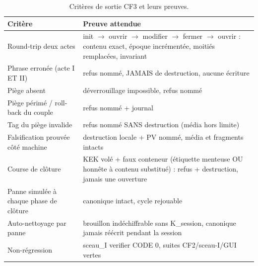 \begin{table}[htbp]
\centering\small
\caption{Critères de sortie CF3 et leurs preuves.}
\label{tab:sortiecf3}
\begin{tabularx}{\textwidth}{@{}Y Y@{}}
\toprule
\textbf{Critère} & \textbf{Preuve attendue} \\
\midrule
Round-trip deux actes & init $\to$ ouvrir $\to$ modifier $\to$ fermer $\to$ ouvrir :
contenu exact, époque incrémentée, moitiés remplacées,  invariant \\
Phrase erronée (acte I ET II) & refus nommé, JAMAIS de destruction, aucune écriture \\
Piège absent & déverrouillage impossible, refus nommé \\
Piège périmé / roll-back du couple & refus nommé + journal \\
Tag du piège invalide & refus nommé SANS destruction (média hors limite) \\
Falsification prouvée côté machine & destruction locale + PV nommé, média et fragments
intacts \\
Course de clôture & KEK volé + faux conteneur (étiquette menteuse OU honnête à
contenu substitué) : refus + destruction, jamais une ouverture \\
Panne simulée à chaque phase de clôture & canonique intact, cycle rejouable \\
Auto-nettoyage par panne & brouillon indéchiffrable sans K\_session, canonique jamais
réécrit pendant la session \\
Non-régression & sceau\_I verifier CODE 0, suites CF2/sceau-I/GUI vertes \\
\bottomrule
\end{tabularx}
\end{table}
